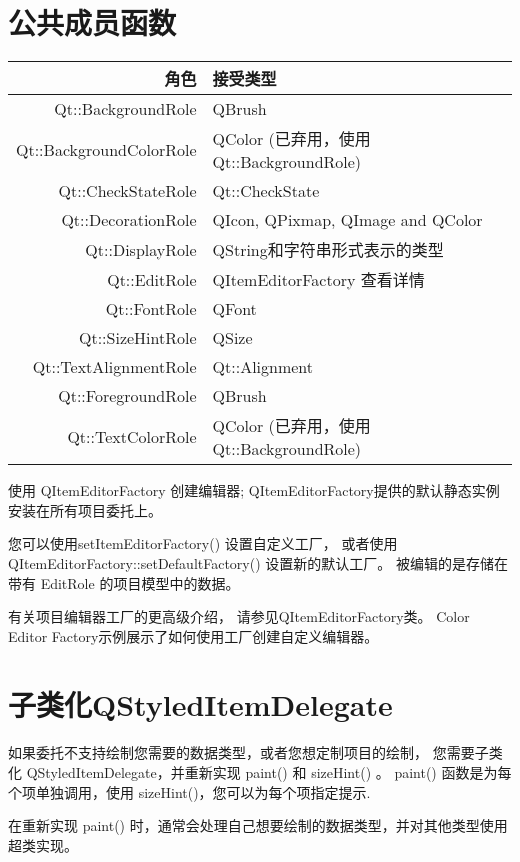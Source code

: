 \section{公共成员函数}

\begin{tabular}{|r|l|}
\hline 
角色	&接受类型 \\
\hline
Qt::BackgroundRole&	QBrush \\ 
\hline
Qt::BackgroundColorRole&	QColor (已弃用，使用Qt::BackgroundRole) \\ 
\hline
Qt::CheckStateRole&	Qt::CheckState \\
\hline
Qt::DecorationRole	& QIcon, QPixmap, QImage and QColor \\ 
\hline
Qt::DisplayRole	& QString和字符串形式表示的类型 \\ 
\hline
Qt::EditRole &	QItemEditorFactory 查看详情 \\ 
\hline
Qt::FontRole &	QFont \\
\hline
Qt::SizeHintRole &	QSize \\ 
\hline
Qt::TextAlignmentRole	&Qt::Alignment \\ 
\hline
Qt::ForegroundRole&	QBrush \\ 
\hline
Qt::TextColorRole	&QColor (已弃用，使用Qt::BackgroundRole) \\ 
\hline
\end{tabular}

使用 QItemEditorFactory 创建编辑器; 
QItemEditorFactory提供的默认静态实例安装在所有项目委托上。

您可以使用setItemEditorFactory() 设置自定义工厂，
或者使用 QItemEditorFactory::setDefaultFactory() 设置新的默认工厂。
被编辑的是存储在带有 EditRole 的项目模型中的数据。

有关项目编辑器工厂的更高级介绍，
请参见QItemEditorFactory类。
Color Editor Factory示例展示了如何使用工厂创建自定义编辑器。



\section{子类化QStyledItemDelegate}

如果委托不支持绘制您需要的数据类型，或者您想定制项目的绘制，
您需要子类化 QStyledItemDelegate，并重新实现 paint() 和 sizeHint() 。 
paint() 函数是为每个项单独调用，使用 sizeHint()，您可以为每个项指定提示.

在重新实现 paint() 时，通常会处理自己想要绘制的数据类型，并对其他类型使用超类实现。

